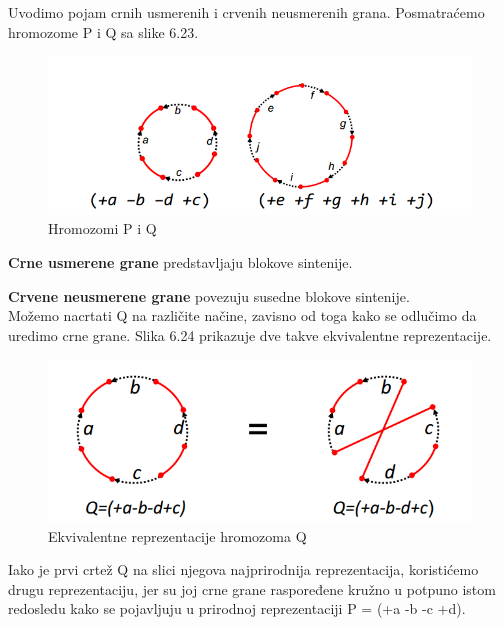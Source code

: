 \noindent Uvodimo pojam crnih usmerenih i crvenih neusmerenih grana. Posmatraćemo hromozome P i Q sa slike 6.23.\\

\begin{figure}[h!]
\centering
\includegraphics[scale=0.6]{poglavlja/6/slike/crne_crvene.PNG}
\caption{Hromozomi P i Q}
\label{slika:X}
\end{figure}

\noindent \textbf{Crne usmerene grane} predstavljaju blokove sintenije.

\noindent \textbf{Crvene neusmerene grane} povezuju susedne blokove sintenije.\\

Možemo nacrtati Q na različite načine, zavisno od toga kako se odlučimo da uredimo crne grane. Slika 6.24 prikazuje dve takve ekvivalentne reprezentacije.\\

\begin{figure}[h!]
\centering
\includegraphics[scale=0.5]{poglavlja/6/slike/ekvivalentne.PNG}
\caption{Ekvivalentne reprezentacije hromozoma Q}
\label{slika:X}
\end{figure}

\newpage
Iako je prvi crtež Q na slici njegova najprirodnija reprezentacija, koristićemo drugu reprezentaciju, jer su joj crne grane raspoređene kružno u potpuno istom redosledu kako se pojavljuju u prirodnoj reprezentaciji P = (+a -b -c +d).\\

